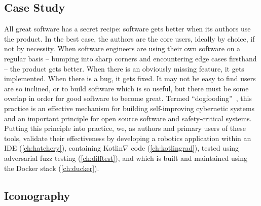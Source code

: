 \documentclass[12pt,initial,twoside,maitrise]{dms}
\numberwithin{equation}{section}
\numberwithin{table}{chapter}
\numberwithin{figure}{chapter}
\begin{document}
\subsection{Case Study}\label{subsec:case-study}

All great software has a secret recipe: software gets better when its authors use the product. In the best case, the authors are the core users, ideally by choice, if not by necessity. When software engineers are using their own software on a regular basis -- bumping into sharp corners and encountering edge cases firsthand -- the product gets better. When there is an obviously missing feature, it gets implemented. When there is a bug, it gets fixed. It may not be easy to find users are so inclined, or to build software which is so useful, but there must be some overlap in order for good software to become great. Termed ``dogfooding''~\citep{harrison2006eating}, this practice is an effective mechanism for building self-improving cybernetic systems and an important principle for open source software and safety-critical systems. Putting this principle into practice, we, as authors and primary users of these tools, validate their effectiveness by developing a robotics application within an IDE (\autoref{ch:hatchery}), containing Kotlin$\nabla$ code (\autoref{ch:kotlingrad}), tested using adversarial fuzz testing (\autoref{ch:difftest}), and which is built and maintained using the Docker stack (\autoref{ch:ducker}).

\subsection{Iconography}
\end{document}
